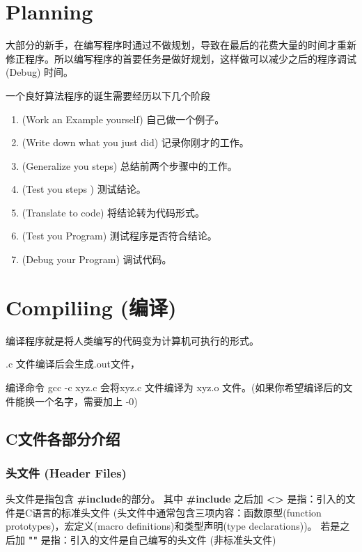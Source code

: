 \section{Planning}
大部分的新手，在编写程序时通过不做规划，导致在最后的花费大量的时间才重新修正程序。所以编写程序的首要任务是做好规划，这样做可以减少之后的程序调试 (Debug) 时间。

一个良好算法程序的诞生需要经历以下几个阶段
\begin{enumerate}
	\item (Work an Example yourself) 自己做一个例子。
	\item (Write down what you just did) 记录你刚才的工作。
	\item (Generalize you steps) 总结前两个步骤中的工作。
	\item (Test you steps ) 测试结论。
	\item (Translate to code) 将结论转为代码形式。
	\item (Test you Program) 测试程序是否符合结论。
	\item (Debug your Program) 调试代码。

\end{enumerate}

\section{Compiliing (编译)}
编译程序就是将人类编写的代码变为计算机可执行的形式。

.c 文件编译后会生成.out文件，

编译命令
gcc -c xyz.c 会将xyz.c 文件编译为 xyz.o 文件。(如果你希望编译后的文件能换一个名字，需要加上 -0)


\begin{figure}
	\centering
	\label{fig:compileCFile}
	
\end{figure}



\subsection{C文件各部分介绍}
\subsubsection{头文件 (Header Files)}
头文件是指包含 \textbf{#include}的部分。
其中 \textbf{#include} 之后加 \textbf{<>} 是指：引入的文件是C语言的标准头文件 (头文件中通常包含三项内容：函数原型(function prototypes)，宏定义(macro definitions)和类型声明(type declarations))。
若是之后加 \textbf{""} 是指：引入的文件是自己编写的头文件 (非标准头文件)


